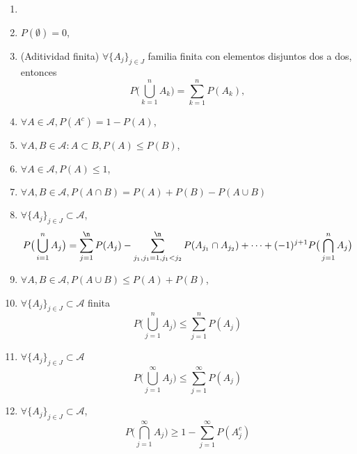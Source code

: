 \begin{prop}
  \begin{enumerate}[label=(\roman*)]
    \item []
    \item $P(\emptyset) = 0$,
    \item (Aditividad finita) $\forall \{ A_{j} \}_{j \in J}$ familia finita con elementos disjuntos dos a dos, entonces
      \[ 
        P \Big ( \bigcup_{k = 1}^{n} A_{k} \Big ) = \sum_{ k = 1 }^{n} P(A_{k}),
      \] 
    \item $\forall A \in \mathcal{A}, P(A^c) = 1 - P(A)$,
    \item $\forall A,B \in \mathcal{A}: A \subset B, P(A) \leq P(B)$,
    \item $\forall A \in \mathcal{A}, P(A) \leq 1$,
    \item $\forall A,B \in \mathcal{A}, P(A \cap B) = P(A) + P(B) - P(A \cup B)$
    \item $\forall \{ A_{j} \}_{j \in J} \subset \mathcal{A}$,
      \[
        P \big (\bigcup_{i = 1}^{n} A_{j} \big) = \sum_{j = 1}^{\n} P(A_{j}) - \sum_{j_{1}, j_{1} = 1, j_{1} < j_{2}}^{\n} P(A_{j_{1}} \cap A_{j_{2}}) + \cdots + (-1)^{j+1} P \big ( \bigcap_{j = 1}^{n} A_{j} \big )
      \]
    \item $\forall A, B \in \mathcal{A}, P(A \cup B) \leq P(A) + P(B)$,
    \item $\forall \{ A_{j} \}_{j \in J} \subset \mathcal{A}$ finita
      \[ 
        P \Big ( \bigcup_{j = 1}^{n} A_{j} \Big ) \leq \sum_{j = 1}^{n} P(A_{j})
      \] 
    \item $\forall \{ A_{j} \}_{j \in J} \subset \mathcal{A}$
      \[ 
        P \Big ( \bigcup_{j = 1}^{\infty} A_{j} \Big ) \leq \sum_{j = 1}^{\infty} P(A_{j})
      \] 
    \item $\forall \{ A_{j} \}_{j \in J} \subset \mathcal{A}$,
      \[ 
        P \Big ( \bigcap_{j = 1}^{\infty} A_{j} \Big ) \geq 1 - \sum_{j = 1}^{\infty} P(A^{c}_{j})
      \] 
  \end{enumerate}
\end{prop}

